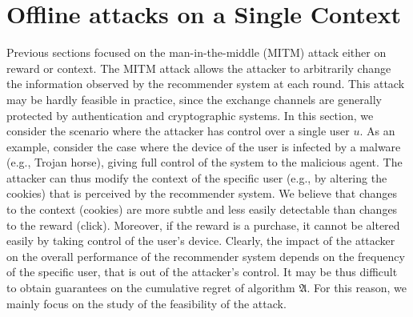 
\vspace{-.1in}
\section{Offline attacks on a Single Context}\label{sec:attack_one_context}
Previous sections focused on the man-in-the-middle (MITM) attack either on reward or context.
{The} MITM attack allows the attacker to arbitrarily change the information observed by the recommender system at each round.
{This attack may be hardly feasible in practice, since the exchange channels are generally protected by authentication and cryptographic systems.} %
In this section, we consider the scenario where the attacker has control over a single user $u$.
As an example, consider the case where the device of the user is infected by a malware (e.g., Trojan horse), giving full control of the system to the malicious agent.
The attacker can thus modify the context of the specific user (e.g., by altering the cookies) that is perceived by the recommender system. %
We believe that changes to the context (\eg cookies) are more subtle and less easily detectable than changes to the reward (\eg click). Moreover, if the reward is a purchase, it cannot be altered easily by taking control of the user's device.
Clearly, the impact of the attacker on the overall performance of the recommender system depends on the frequency of the specific user, that is out of the attacker's control. It may be thus difficult to obtain guarantees on the cumulative regret of algorithm $\mathfrak{A}$.
For this reason, we mainly focus on the study of the feasibility of the attack.

